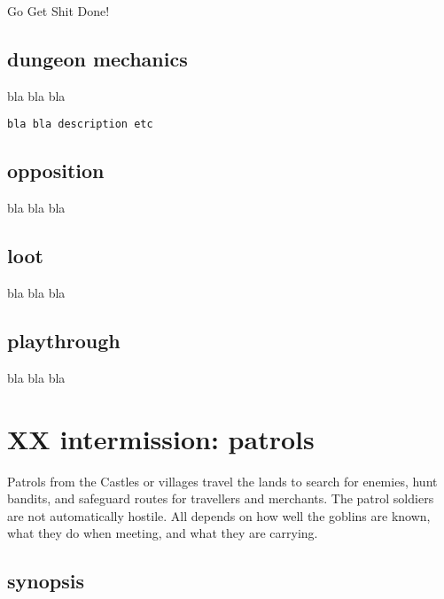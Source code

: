 \begin{readoutloud}
Go Get Shit Done!
\end{readoutloud}


\subsection*{dungeon mechanics}

bla bla bla

\small \begin{verbatim}
bla bla description etc
\end{verbatim} \normalsize


\subsection*{opposition}

bla bla bla


\subsection*{loot}

bla bla bla


\subsection*{playthrough}

bla bla bla










\newpage
\section*{XX intermission: patrols}


Patrols from the Castles or villages travel the lands to search for enemies, hunt bandits, and safeguard routes for travellers and merchants. The patrol soldiers are not automatically hostile. All depends on how well the goblins are known, what they do when meeting, and what they are carrying.


\subsection*{synopsis}

